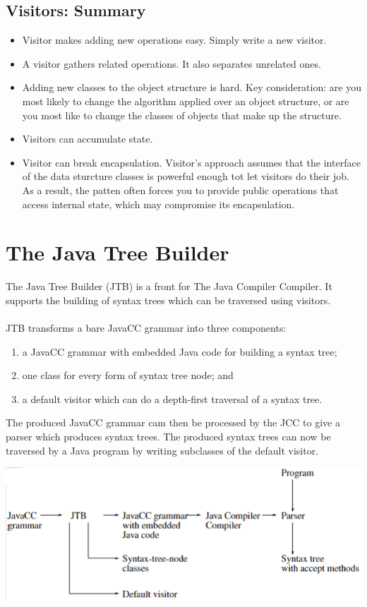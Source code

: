 \documentclass[10pt]{article}
\begin{document}
\subsection*{Visitors: Summary}
\begin{itemize}
    \item Visitor makes adding new operations easy.  Simply write a new visitor.
    \item A visitor gathers related operations.  It also separates unrelated ones.
    \item Adding new classes to the object structure is hard.  Key consideration: are you most likely to change the algorithm applied over an object structure, or are you most like to change the classes of objects that make up the structure.
    \item Visitors can accumulate state.
    \item Visitor can break encapsulation.  Visitor's approach assumes that the interface of the data sturcture classes is powerful enough tot let visitors do their job.  As a result, the patten often forces you to provide public operations that access internal state, which may compromise its encapsulation.
\end{itemize}

\section*{The Java Tree Builder}
The Java Tree Builder (JTB) is a front for The Java Compiler Compiler.  It supports the building of syntax trees which can be traversed using visitors.\\\\
JTB transforms a bare JavaCC grammar into three components:
\begin{enumerate}
    \item a JavaCC grammar with embedded Java code for building a syntax tree;
    \item one class for every form of syntax tree node; and
    \item a default visitor which can do a depth-first traversal of a syntax tree.
\end{enumerate}
The produced JavaCC grammar cam then be processed by the JCC to give a parser which produces syntax trees.  The produced syntax trees can now be traversed by a Java program by writing subclasses of the default visitor.
\begin{center}
    \includegraphics*[scale=0.9]{W2_1.png}
\end{center}
\end{document}
